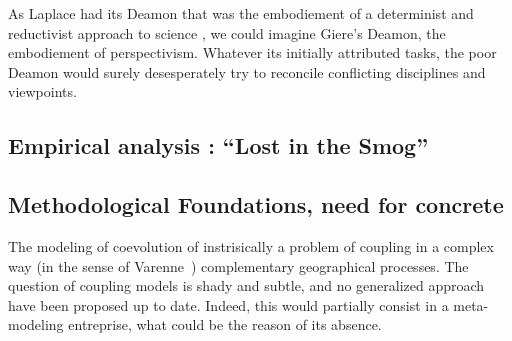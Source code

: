 

As Laplace had its Deamon that was the embodiement of a determinist and reductivist approach to science
, we could imagine Giere's Deamon, the embodiement of perspectivism. Whatever its initially attributed tasks, the poor Deamon would surely desesperately try to reconcile conflicting disciplines and viewpoints.




\subsection{Empirical analysis : ``Lost in the Smog''}








\subsection{Methodological Foundations, need for concrete}


The modeling of coevolution of instrisically a problem of coupling in a complex way (in the sense of Varenne~\cite{varenne2010framework})
complementary geographical processes. The question of coupling models is shady and subtle, and no generalized approach have been proposed up to date. Indeed, this would partially consist in a meta-modeling entreprise, what could be the reason of its absence.

